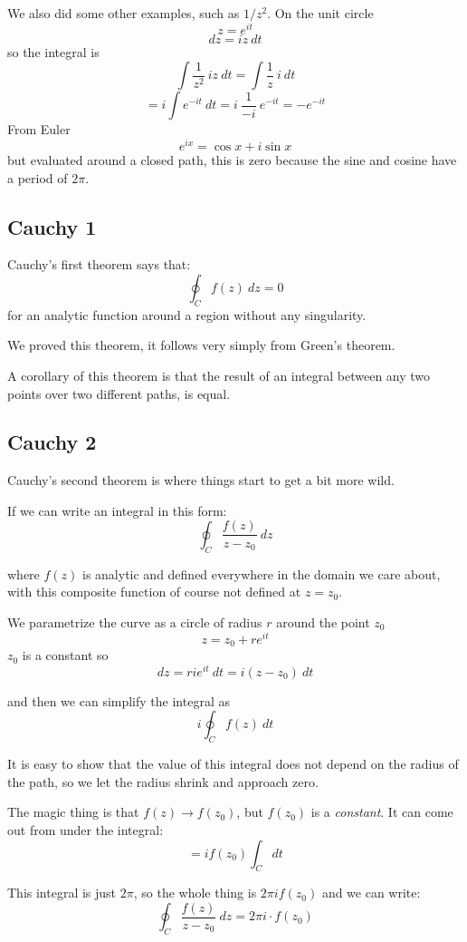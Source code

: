 \documentclass[11pt, oneside]{article}
\begin{document}
We also did some other examples, such as $1/z^2$.  On the unit circle
\[ z = e^{it} \]
\[ dz = iz \ dt \]
so the integral is
\[ \int \frac{1}{z^2} \ iz \ dt = \int \frac{1}{z} \ i \ dt \]
\[ = i \int e^{-it} \ dt = i \ \frac{1}{-i} \ e^{-it} = - e^{-it} \]
From Euler
\[ e^{ix} = \cos x + i \sin x \]
but evaluated around a closed path, this is zero because the sine and cosine have a period of $2 \pi$.

\subsection*{Cauchy 1}

Cauchy's first theorem says that:
\[ \oint_C f(z) \ dz = 0 \] 
for an analytic function around a region without any singularity.

We proved this theorem, it follows very simply from Green's theorem.

A corollary of this theorem is that the result of an integral between any two points over two different paths, is equal.

\subsection*{Cauchy 2}

Cauchy's second theorem is where things start to get a bit more wild.  

If we can write an integral in this form:
\[ \oint_{C} \frac{f(z)}{z-z_0} \ dz \]

where $f(z)$ is analytic and defined everywhere in the domain we care about, with this composite function of course not defined at $z = z_0$.

We parametrize the curve as a circle of radius $r$ around the point $z_0$
\[ z = z_0 + re^{it} \]
$z_0$ is a constant so
\[ dz = ri e^{it} \ dt =  i(z-z_0) \ dt \] 

and then we can simplify the integral as
\[ i \oint_{C} f(z) \ dt \]

It is easy to show that the value of this integral does not depend on the radius of the path, so we let the radius shrink and approach zero.  

The magic thing is that $f(z) \rightarrow f(z_0)$, but $f(z_0)$ is a \emph{constant}.  It can come out from under the integral:
\[ = i f(z_0) \int_{C} dt \]

This integral is just $2\pi$, so the whole thing is $2 \pi i f(z_0)$ and we can write:
\[ \oint_C \frac{f(z)}{z-z_0} \ dz = 2 \pi i \cdot f(z_0) \]
\end{document}
